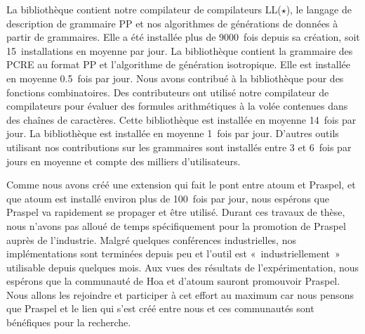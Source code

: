 La bibliothèque  contient notre compilateur de
compilateurs LL($\star$), le langage de description de grammaire PP et nos
algorithmes de générations de données à partir de grammaires. Elle a été
installée plus de 9000~fois depuis sa création, soit 15~installations en moyenne
par jour. La bibliothèque  contient la grammaire des
PCRE au format PP et l'algorithme de génération isotropique. Elle est installée
en moyenne 0.5~fois par jour. Nous avons contribué à la bibliothèque
 pour des fonctions combinatoires. Des contributeurs ont
utilisé notre compilateur de compilateurs pour évaluer des formules
arithmétiques à la volée contenues dans des chaînes de caractères. Cette
bibliothèque est installée en moyenne 14~fois par jour. La bibliothèque
 est installée en moyenne 1~fois par jour.  D'autres
outils utilisant nos contributions sur les grammaires sont installés entre 3 et
6~fois par jours en moyenne et compte des milliers d'utilisateurs. 

Comme nous avons créé une extension qui fait le pont entre atoum et Praspel, et
que atoum est installé environ plus de 100~fois par jour, nous espérons que
Praspel va rapidement se propager et être utilisé. Durant ces travaux de thèse,
nous n'avons pas alloué de temps spécifiquement pour la promotion de Praspel
auprès de l'industrie. Malgré quelques conférences industrielles, nos
implémentations sont terminées depuis peu et l'outil est «~industriellement~»
utilisable depuis quelques mois. Aux vues des résultats de l'expérimentation,
nous espérons que la communauté de Hoa et d'atoum sauront promouvoir Praspel.
Nous allons les rejoindre et participer à cet effort au maximum car nous pensons
que Praspel et le lien qui s'est créé entre nous et ces communautés sont
bénéfiques pour la recherche.
